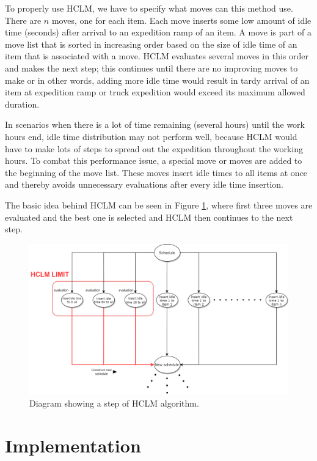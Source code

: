 \documentclass{ctuthesis}
\begin{document}
To properly use HCLM, we have to specify what moves can this method use. 
There are $n$ moves, one for each item. Each move inserts some low amount of idle time (seconds) after arrival to an expedition ramp of an item. A move is part of a move list that is sorted in increasing order based on the size of idle time of an item that is associated with a move. HCLM evaluates several moves in this order and makes the next step; this continues until there are no improving moves to make or in other words, adding more idle time would result in tardy arrival of an item at expedition ramp or truck expedition would exceed its maximum allowed duration.

 
In scenarios when there is a lot of time remaining (several hours) until the work hours end, idle time distribution may not perform well, because HCLM would have to make lots of steps to spread out the expedition throughout the working hours. To combat this performance issue, a special move or moves are added to the beginning of the move list. These moves insert idle times to all items at once and thereby avoids unnecessary evaluations after every idle time insertion.


 The basic idea behind HCLM can be seen in Figure \ref{fig:hclm}, where first three moves are evaluated and the best one is selected and HCLM then continues to the next step. 
 
 \begin{figure}[h]
\includegraphics[width=1\linewidth]{HCLM.png}
\caption{Diagram showing a step of HCLM algorithm.}
\label{fig:hclm}
\end{figure}

\chapter{Implementation}
\end{document}
